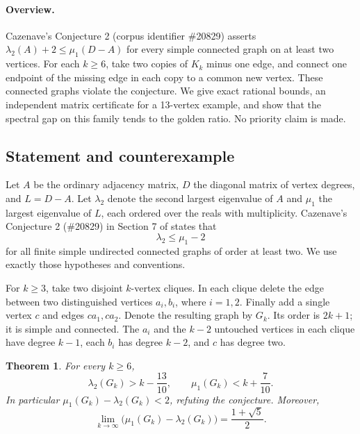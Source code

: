 \documentclass[11pt,a4paper]{article}
\newtheorem{SourceRbbHtheorem}{Theorem}
\begin{document}
\begingroup

\setcounter{equation}{0}
\renewcommand{\theequation}{\thesection.\arabic{equation}}
\renewcommand{\theHequation}{R11H.\arabic{equation}}
\paragraph{Overview.}
Cazenave's Conjecture 2 (corpus identifier \#20829) asserts
\(\lambda_2(A)+2\leq\mu_1(D-A)\) for every simple connected graph
on at least two vertices. For each \(k\geq6\), take two copies
of \(K_k\) minus one edge, and connect one endpoint of the
missing edge in each copy to a common new vertex. These connected
graphs violate the conjecture. We give exact rational bounds, an
independent matrix certificate for a 13-vertex example, and show
that the spectral gap on this family tends to the golden ratio.
No priority claim is made.


\subsection{Statement and counterexample}
Let \(A\) be the ordinary adjacency matrix, \(D\) the diagonal matrix
of vertex degrees, and \(L=D-A\). Let \(\lambda_2\) denote the second
largest eigenvalue of \(A\) and \(\mu_1\) the largest eigenvalue
of \(L\), each ordered over the reals with multiplicity. Cazenave's
Conjecture 2 (\#20829) in Section 7 of \cite{R11H:cazenave} states that
\[
  \lambda_2 \leq \mu_1-2
\]
for all finite simple undirected connected graphs of order at least
two. We use exactly those hypotheses and conventions.

For \(k\geq 3\), take two disjoint \(k\)-vertex cliques. In each clique
delete the edge between two distinguished vertices \(a_i,b_i\), where
\(i=1,2\). Finally add a single vertex \(c\) and edges \(ca_1,ca_2\).
Denote the resulting graph by \(G_k\). Its order is \(2k+1\);
it is simple and connected. The \(a_i\) and the \(k-2\) untouched
vertices in each clique have degree \(k-1\), each \(b_i\) has degree
\(k-2\), and \(c\) has degree two.

\begin{SourceRbbHtheorem}\label{R11H:thm:main}
For every \(k\geq6\),
\[
   \lambda_2(G_k)>k-\frac{13}{10},\qquad
   \mu_1(G_k)<k+\frac7{10}.
\]
In particular \(\mu_1(G_k)-\lambda_2(G_k)<2\), refuting the conjecture.
Moreover,
\[
  \lim_{k\to\infty}\bigl(\mu_1(G_k)-\lambda_2(G_k)\bigr)
  =\frac{1+\sqrt{5}}{2}.
\]
\end{SourceRbbHtheorem}
\end{document}
